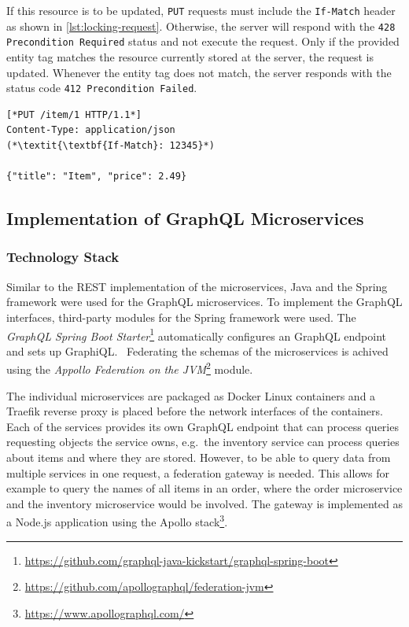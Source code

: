 If this resource is to be updated, \texttt{PUT} requests must include the \texttt{If-Match} header as shown in \autoref{lst:locking-request}.
Otherwise, the server will respond with the \texttt{428 Precondition Required} status and not execute the request.
Only if the provided entity tag matches the resource currently stored at the server, the request is updated.
Whenever the entity tag does not match, the server responds with the status code \texttt{412 Precondition Failed}.

\begin{lstlisting}[caption={Request to Update Resources}, showlines=true, label=lst:locking-request, language=http]
[*PUT /item/1 HTTP/1.1*]
Content-Type: application/json
(*\textit{\textbf{If-Match}: 12345}*)

{"title": "Item", "price": 2.49}
\end{lstlisting}

\subsection{Implementation of GraphQL Microservices}\label{sec:cs-graphql}

\subsubsection{Technology Stack}\label{sec:graphql-tech}

Similar to the \ac{REST} implementation of the microservices, Java and the Spring framework were used for the GraphQL microservices.
To implement the GraphQL interfaces, third-party modules for the Spring framework were used.
The \textit{GraphQL Spring Boot Starter}\footnote{\url{https://github.com/graphql-java-kickstart/graphql-spring-boot}} automatically configures an GraphQL endpoint and sets up GraphiQL.~%
Federating the schemas of the microservices is achived using the \textit{Appollo Federation on the \acs{JVM}}\footnote{\url{https://github.com/apollographql/federation-jvm}} module.

The individual microservices are packaged as Docker Linux containers and a Traefik reverse proxy is placed before the network interfaces of the containers.
Each of the services provides its own GraphQL endpoint that can process queries requesting objects the service owns, e.g.~the inventory service can process queries about items and where they are stored.
However, to be able to query data from multiple services in one request, a federation gateway is needed.
This allows for example to query the names of all items in an order, where the order microservice and the inventory microservice would be involved.
The gateway is implemented as a Node.js application using the Apollo stack\footnote{\url{https://www.apollographql.com/}}.

